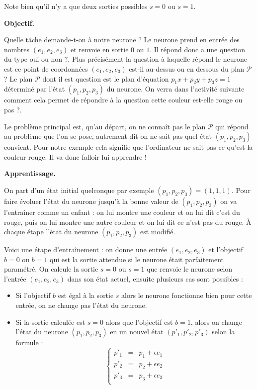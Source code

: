 \documentclass[11pt,class=report,crop=false]{standalone}
\begin{document}
\begin{cours}[Neurone]
Note bien qu'il n'y a que deux sorties possibles $s=0$ ou $s=1$.

\medskip
\textbf{Objectif.}

Quelle tâche demande-t-on à notre neurone ? Le neurone prend en entrée des nombres $(e_1,e_2,e_3)$ et renvoie en sortie $0$ ou $1$. Il répond donc a une question du type \og{}oui ou non ?\fg{}.
Plus précisément la question à laquelle répond le neurone est \og{}ce point de coordonnées $(e_1,e_2,e_3)$ est-il au-dessus ou en dessous du plan $\mathcal{P}$ ?\fg{} Le plan $\mathcal{P}$ dont il est question est le plan d'équation $p_1x+p_2y+p_3z=1$ déterminé par l'état $(p_1,p_2,p_3)$ du neurone.
On verra dans l'activité suivante comment cela permet de répondre à la question \og{}cette couleur est-elle rouge ou pas ?\fg{}.

Le problème principal est, qu'au départ, on ne connaît pas le plan $\mathcal{P}$ qui répond au problème que l'on se pose, autrement dit on ne sait pas quel état $(p_1,p_2,p_3)$ convient. Pour notre exemple cela signifie que l'ordinateur ne sait pas ce qu'est la couleur rouge. Il va donc falloir lui apprendre !

\medskip
\textbf{Apprentissage.}

On part d'un état initial quelconque par exemple $(p_1,p_2,p_3)=(1,1,1)$.
Pour faire évoluer l'état du neurone jusqu'à la bonne valeur de $(p_1,p_2,p_3)$ on 
va l'entraîner comme un enfant : on lui montre une couleur et on lui dit \og{}c'est du rouge\fg{}, puis on lui montre une autre couleur et on lui dit \og{}ce n'est pas du rouge\fg{}.
\`A chaque étape l'état du neurone $(p_1,p_2,p_3)$ est modifié.

Voici une étape d'entraînement : on donne une entrée $(e_1,e_2,e_3)$ et l'objectif $b=0$ ou $b=1$ qui est la sortie attendue si le neurone était parfaitement paramétré.
On calcule la sortie $s=0$ ou $s=1$ que renvoie le neurone selon l'entrée $(e_1,e_2,e_3)$ dans son état actuel, ensuite plusieurs cas sont possibles :
\begin{itemize} 
	\item Si l'objectif $b$ est égal à la sortie $s$ alors le neurone fonctionne bien pour cette entrée, on ne change pas l'état du neurone.
	
	\item Si la sortie calculée est $s=0$ alors que l'objectif est $b=1$, alors on change l'état du neurone $(p_1,p_2,p_3)$ en un nouvel état $(p'_1,p'_2,p'_3)$ selon la formule :
$$\left\{ 
\begin{array}{rcl}
p'_1 &=& p_1 + \epsilon e_1 \\
p'_2 &=& p_2 + \epsilon e_2 \\
p'_3 &=& p_3 + \epsilon e_3 \\
\end{array}
\right.$$			


\end{itemize}
\end{cours}
\end{document}
